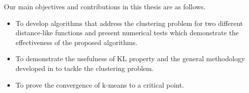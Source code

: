 Our main objectives and contributions in this thesis are as follows.
\begin{itemize}
	\item To develop algorithms that address the clustering problem for two different distance-like functions and present numerical tests which demonstrate the effectiveness of the proposed algorithms.
	
	\item To demonstrate the usefulness of KL property and the general methodology developed in \cite{BST2014} to tackle the clustering problem. %
  
	\item To prove the convergence of k-means to a critical point.
\end{itemize}

